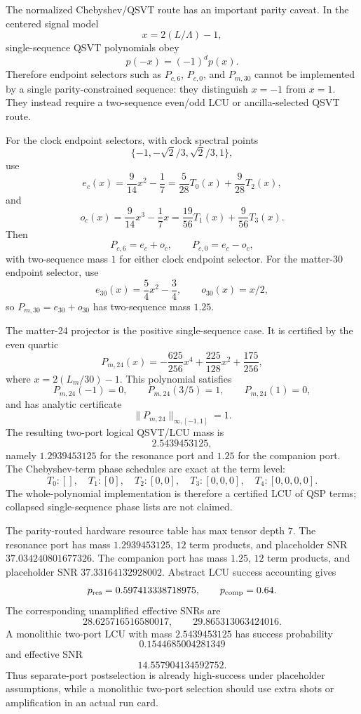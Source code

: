 The normalized Chebyshev/QSVT route has an important parity caveat.  In the
centered signal model
\[
x=2(L/\Lambda)-1,
\]
single-sequence QSVT polynomials obey
\[
p(-x)=(-1)^d p(x).
\]
Therefore endpoint selectors such as $P_{c,6}$, $P_{c,0}$, and $P_{m,30}$ cannot
be implemented by a single parity-constrained sequence: they distinguish
$x=-1$ from $x=1$.  They instead require a two-sequence even/odd LCU or
ancilla-selected QSVT route.

For the clock endpoint selectors, with clock spectral points
\[
\{-1,-\sqrt2/3,\sqrt2/3,1\},
\]
use
\[
e_c(x)=\frac{9}{14}x^2-\frac17
=\frac{5}{28}T_0(x)+\frac{9}{28}T_2(x),
\]
and
\[
o_c(x)=\frac{9}{14}x^3-\frac17x
=\frac{19}{56}T_1(x)+\frac{9}{56}T_3(x).
\]
Then
\[
P_{c,6}=e_c+o_c,
\qquad
P_{c,0}=e_c-o_c,
\]
with two-sequence mass $1$ for either clock endpoint selector.  For the matter-30
endpoint selector, use
\[
e_{30}(x)=\frac54x^2-\frac34,
\qquad
o_{30}(x)=x/2,
\]
so $P_{m,30}=e_{30}+o_{30}$ has two-sequence mass $1.25$.

The matter-24 projector is the positive single-sequence case.  It is certified by
the even quartic
\[
P_{m,24}(x)=-\frac{625}{256}x^4+\frac{225}{128}x^2+\frac{175}{256},
\]
where $x=2(L_m/30)-1$.  This polynomial satisfies
\[
P_{m,24}(-1)=0,
\qquad
P_{m,24}(3/5)=1,
\qquad
P_{m,24}(1)=0,
\]
and has analytic certificate
\[
\|P_{m,24}\|_{\infty,[-1,1]}=1.
\]
The resulting two-port logical QSVT/LCU mass is
\[
\boxed{2.5439453125},
\]
namely $1.2939453125$ for the resonance port and $1.25$ for the companion port.
The Chebyshev-term phase schedules are exact at the term level:
\[
T_0:[],\quad T_1:[0],\quad T_2:[0,0],\quad T_3:[0,0,0],\quad T_4:[0,0,0,0].
\]
The whole-polynomial implementation is therefore a certified LCU of QSP terms;
collapsed single-sequence phase lists are not claimed.

The parity-routed hardware resource table has max tensor depth $7$.  The
resonance port has mass $1.2939453125$, $12$ term products, and placeholder SNR
$37.034240801677326$.  The companion port has mass $1.25$, $12$ term products,
and placeholder SNR $37.33164132928002$.  Abstract LCU success accounting gives
\[
p_{\rm res}=0.597413338718975,
\qquad
p_{\rm comp}=0.64.
\]
The corresponding unamplified effective SNRs are
\[
28.625716516580017,
\qquad
29.865313063424016.
\]
A monolithic two-port LCU with mass $2.5439453125$ has success probability
\[
0.1544685004281349
\]
and effective SNR
\[
14.557904134592752.
\]
Thus separate-port postselection is already high-success under placeholder
assumptions, while a monolithic two-port selection should use extra shots or
amplification in an actual run card.

